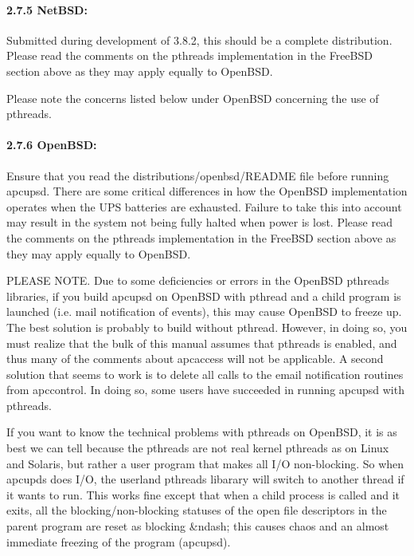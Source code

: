 \paragraph*{2.7.5 NetBSD:}

\label{index-NetBSD-40}
\label{index-OS_002c-NetBSD-41}
Submitted during development of 3.8.2, this should be a complete distribution.
Please read the comments on the pthreads implementation in the FreeBSD
section above as they may apply equally to OpenBSD.  

Please note the concerns listed below under OpenBSD concerning the use of
pthreads. 

\label{OpenBSD}

\paragraph*{2.7.6 OpenBSD:}

\label{index-OpenBSD-42}
\label{index-OS_002c-OpenBSD-43}
Ensure that you read the distributions/openbsd/README file before running
apcupsd. There are some critical differences in how the OpenBSD implementation
operates when the UPS batteries are exhausted. Failure to take this into
account may result in the system not being fully halted when power is lost. 
Please read the comments on the pthreads implementation in the FreeBSD section
above as they may apply equally to OpenBSD.  

PLEASE NOTE. Due to some deficiencies or errors in the OpenBSD pthreads
libraries, if you build apcupsd on OpenBSD with pthread and a child program is
launched (i.e. mail notification of events), this may cause OpenBSD to freeze
up. The best solution is probably to build without pthread. However, in doing
so, you must realize that the bulk of this manual assumes that pthreads is
enabled, and thus many of the comments about apcaccess will not be applicable.
A second solution that seems to work is to delete all calls to the email
notification routines from apccontrol. In doing so, some users have succeeded
in running apcupsd with pthreads.  

If you want to know the technical problems with pthreads on OpenBSD, it is as
best we can tell because the pthreads are not real kernel pthreads as on Linux
and Solaris, but rather a user program that makes all I/O non-blocking. So
when apcupds does I/O, the userland pthreads libarary will switch to another
thread if it wants to run. This works fine except that when a child process is
called and it exits, all the blocking/non-blocking statuses of the open file
descriptors in the parent program are reset as blocking \&ndash; this causes
chaos and an almost immediate freezing of the program (apcupsd). 

